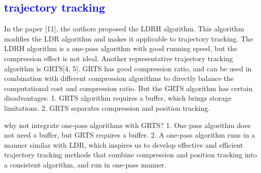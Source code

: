 \subsection{\textcolor{blue}{trajectory tracking}}
In the paper [11], the authors proposed the LDRH algorithm. This algorithm modifies the LDR algorithm and makes it applicable to trajectory tracking. The LDRH algorithm is a one-pass algorithm with good running speed, but the compression effect is not ideal.
Another representative trajectory tracking algorithm is GRTS[4, 5]. GRTS has good compression ratio, and can be used in combination with different compression algorithms to directly balance the computational cost and compression ratio. But the GRTS algorithm has certain disadvantages: 1. GRTS algorithm requires a buffer, which brings storage limitations. 2. GRTS separates compression and position tracking. 

why not integrate one-pass algorithms with GRTS? 1. One pass algorithm does not need a buffer, but GRTS requires a buffer. 2. A one-pass algorithm runs in a manner similar with LDR, which inspires us to develop effective and efficient trajectory tracking methods that combine compression and position tracking into a consistent algorithm, and run in one-pass manner.



